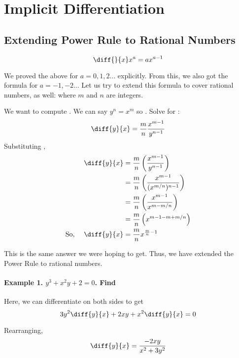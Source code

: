 

\chapter{Implicit Differentiation}

\bigbreak
\section{Extending Power Rule to Rational Numbers}

$$ \diff{}{x} x^a = ax^{a-1} $$

We proved the above for $a = 0, 1, 2\ldots$ explicitly.
From this, we also got the formula for $a = -1, -2\ldots$
Let us try to extend this formula to cover rational numbers, as well:
 where $m$ and $n$ are integers.


We want to compute . 
We can say $y^n = x^m$ so .
Solve for  :
$$ \diff{y}{x} = \frac{m}{n} \frac{x^{m-1}}{y^{n-1}} $$
Substituting ,
\begin{align*}
	\diff{y}{x} & = \frac{m}{n} \left( \frac{x^{m-1}}{y^{n-1}} \right) \\
		& = \frac{m}{n} \left( \frac{x^{m-1}}{(x^{m/n})^{n-1}} \right) \\
		& = \frac{m}{n} \left( \frac{x^{m-1}}{x^{m-m/n}} \right) \\
		& = \frac{m}{n} \left( x^{m - 1 - m + m/n} \right) \\
\text{So, } \quad \diff{y}{x} & = \frac{m}{n} x^{\frac{m}{n} - 1} \\
\end{align*}

This is the same answer we were hoping to get. 
Thus, we have extended the Power Rule to rational numbers.

\subsubsection*{Example 1. $y^3+x^2y+2 = 0$. Find }

Here, we can differentiate on both sides to get 
$$ 3y^2\diff{y}{x} + 2xy + x^2\diff{y}{x} = 0 $$

Rearranging, $$ \diff{y}{x} = \frac{-2xy}{x^2+3y^2} $$
